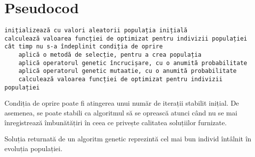 \section{Pseudocod}

\begin{verbatim}
inițializează cu valori aleatorii populația inițială 
calculează valoarea funcției de optimizat pentru indivizii populației  
cât timp nu s-a îndeplinit condiția de oprire 
    aplică o metodă de selecție, pentru a crea populația 
    aplică operatorul genetic încrucișare, cu o anumită probabilitate 
    aplică operatorul genetic mutaatie, cu o anumită probabilitate 
    calculează valoarea funcției de optimizat pentru indivizii populației 
\end{verbatim}

Condiția de oprire poate fi atingerea unui număr de iterații stabilit inițial. De asemenea, se poate stabili ca algoritmul să se oprească atunci când nu se mai înregistrează îmbunătățiri în ceea ce privește calitatea soluțiilor furnizate.  
 
Soluția returnată de un algoritm genetic reprezintă cel mai bun individ întâlnit în evoluția populației.  

\hfill \break
\hfill \break

\clearpage